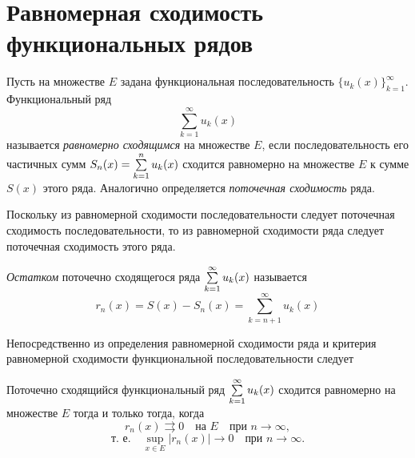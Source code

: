 \section{Равномерная сходимость функциональных рядов}

\begin{defn}
	Пусть на множестве $E$ задана функциональная последовательность $\{u_k(x)\}_{k=1}^\infty$.
	Функциональный ряд
	\begin{equation}
		\label{ch12:p2:eq:fun_series}
		\sum_{k=1}^{\infty} u_k(x)
	\end{equation}
	называется \textit{равномерно сходящимся} на множестве $E$, если последовательность его
	частичных сумм $S_n(x) = \sum_{k=1}^{n}\limits u_k(x)$ сходится равномерно на множестве $E$
	к сумме $S(x)$ этого ряда. Аналогично определяется \textit{поточечная сходимость} ряда.
\end{defn}

Поскольку из равномерной сходимости последовательности следует поточечная сходимость последовательности,
то из равномерной сходимости ряда следует поточечная сходимость этого ряда.

\begin{defn}
	\textit{Остатком} поточечно сходящегося ряда $\sum_{k=1}^{\infty}\limits u_k(x)$ называется
	$$
		r_n(x) = S(x) - S_n(x) = \sum_{k=n+1}^{\infty} u_k(x)
	$$
\end{defn}

Непосредственно из определения равномерной сходимости ряда и критерия равномерной сходимости
функциональной последовательности следует

\begin{thm}
	\label{ch12:th:ce_series_criteria}
	Поточечно сходящийся функциональный ряд $\sum_{k=1}^{\infty}\limits u_k(x)$ сходится
	равномерно на множестве $E$ тогда и только тогда, когда
	$$
		r_n(x) \rightrightarrows 0 \quad \text{на } E \quad \text{при } n \to \infty,
	$$
	$$
		\text{т. е.} \quad \sup_{x \in E} |r_n(x)| \to 0 \quad \text{при } n \to \infty.
	$$
\end{thm}

